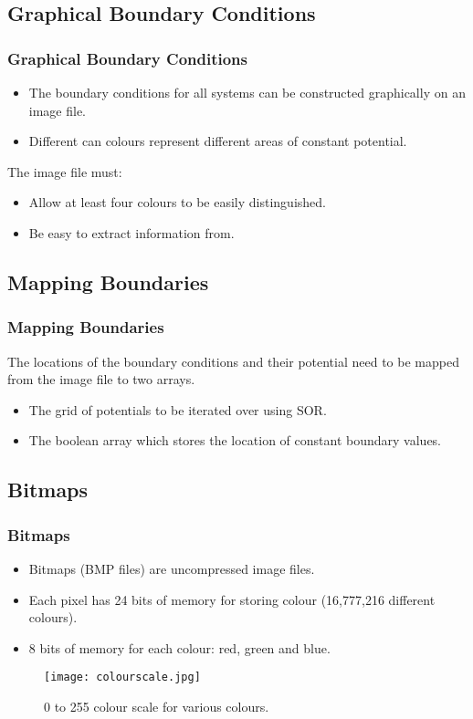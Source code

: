 \documentclass{beamer}
\begin{document}
\subsection{Graphical Boundary Conditions}
\begin{frame}
\frametitle{Graphical Boundary Conditions}
\begin{itemize}
\item The boundary conditions for all systems can be constructed graphically on an image file. 
\item Different can colours represent different areas of constant potential.
\end{itemize}
The image file must:
\begin{itemize}
\item Allow at least four colours to be easily distinguished.
\item Be easy to extract information from.
\end{itemize}
\end{frame}
\begin{frame}
\subsection{Mapping Boundaries}
\frametitle{Mapping Boundaries}
The locations of the boundary conditions and their potential need to be mapped from the image file to two arrays.
\begin{itemize}
\item The grid of potentials to be iterated over using SOR.
\item The boolean array which stores the location of constant boundary values.
\end{itemize}
\end{frame}
\begin{frame}
\subsection{Bitmaps}
\frametitle{Bitmaps}
\begin{itemize}
\item Bitmaps (BMP files) are uncompressed image files.
\item Each pixel has 24 bits of memory for storing colour (16,777,216 different colours).
\item 8 bits of memory for each colour: red, green and blue.
\end{itemize}
\begin{figure}[H]
	\centering
	\texttt{[image: colourscale.jpg]}
	\caption{0 to 255 colour scale for various colours.}
\end{figure}
\end{frame}
\end{document}
